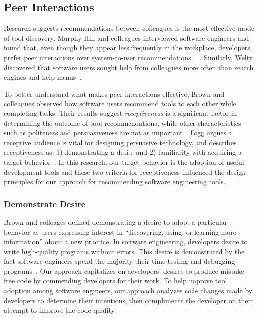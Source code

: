 \documentclass[sigconf,review,anonymous]{acmart}
\begin{document}
\subsection{Peer Interactions}

Research suggests recommendations between colleagues is the most effective mode of tool discovery. Murphy-Hill and colleagues interviewed software engineers and found that, even though they appear less frequently in the workplace, developers prefer peer interactions over system-to-user recommendations.~\cite{MurphyHill2011PeerInteraction}~\cite{Murphy-Hill2015HowDoUsers}. Similarly, Welty discovered that software users sought help from colleagues more often than search engines and help menus~\cite{Welty2011Help}. 

To better understand what makes peer interactions effective, Brown and colleagues observed how software users recommend tools to each other while completing tasks. Their results suggest \emph{receptiveness} is a significant factor in determining the outcome of tool recommendations, while other characteristics such as politeness and persuasiveness are not as important~\cite{vlhcc17}. Fogg argues a receptive audience is vital for designing persuasive technology, and describes receptiveness as: 1) demonstrating a desire and 2) familiarity with acquiring a target behavior~\cite{FoggPersuasive}. In this research, our target behavior is the adoption of useful development tools and these two criteria for receptiveness influenced the design principles for our approach for recommending software engineering tools.

\subsubsection{Demonstrate Desire}

Brown and colleages defined demonstrating a desire to adopt a particular behavior as users expressing interest in ``discovering, using, or learning more information'' about a new practice. In software engineering, developers desire to write high-quality programs without errors. This desire is demonstrated by the fact software engineers spend the majority their time testing and debugging programs~\cite{NIST}. Our approach capitalizes on developers' desires to produce mistake-free code by commending developers for their work. To help improve tool adoption among software engineers, our approach analyzes code changes made by developers to determine their intentions, then compliments the developer on their attempt to improve the code quality.
\end{document}
